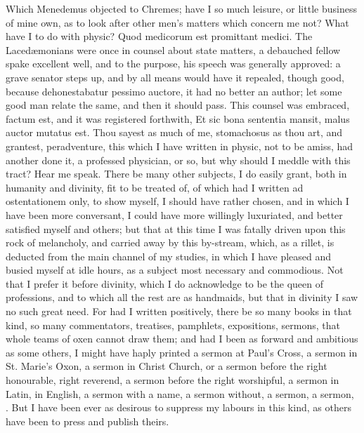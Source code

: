 {Which Menedemus objected to Chremes; have I so much leisure, or little
business of mine own, as to look after other men's matters which
concern me not? What have I to do with physic? Quod medicorum est
promittant medici. The Laced\ae{}monians were once in counsel about
state matters, a debauched fellow spake excellent well, and to the
purpose, his speech was generally approved: a grave senator steps up,
and by all means would have it repealed, though good, because
dehonestabatur pessimo auctore, it had no better an author; let some
good man relate the same, and then it should pass. This counsel was
embraced, factum est, and it was registered forthwith, Et sic bona
sententia mansit, malus auctor mutatus est. Thou sayest as much of me,
stomachosus as thou art, and grantest, peradventure, this which I have
written in physic, not to be amiss, had another done it, a professed
physician, or so, but why should I meddle with this tract? Hear me
speak. There be many other subjects, I do easily grant, both in
humanity and divinity, fit to be treated of, of which had I written ad
ostentationem only, to show myself, I should have rather chosen, and in
which I have been more conversant, I could have more willingly
luxuriated, and better satisfied myself and others; but that at this
time I was fatally driven upon this rock of melancholy, and carried
away by this by-stream, which, as a rillet, is deducted from the main
channel of my studies, in which I have pleased and busied myself at
idle hours, as a subject most necessary and commodious. Not that I
prefer it before divinity, which I do acknowledge to be the queen of
professions, and to which all the rest are as handmaids, but that in
divinity I saw no such great need. For had I written positively, there
be so many books in that kind, so many commentators, treatises,
pamphlets, expositions, sermons, that whole teams of oxen cannot draw
them; and had I been as forward and ambitious as some others, I might
have haply printed a sermon at Paul's Cross, a sermon in St. Marie's
Oxon, a sermon in Christ Church, or a sermon before the right
honourable, right reverend, a sermon before the right worshipful, a
sermon in Latin, in English, a sermon with a name, a sermon without, a
sermon, a sermon, \etc. But I have been ever as desirous to suppress my
labours in this kind, as others have been to press and publish theirs.

}
